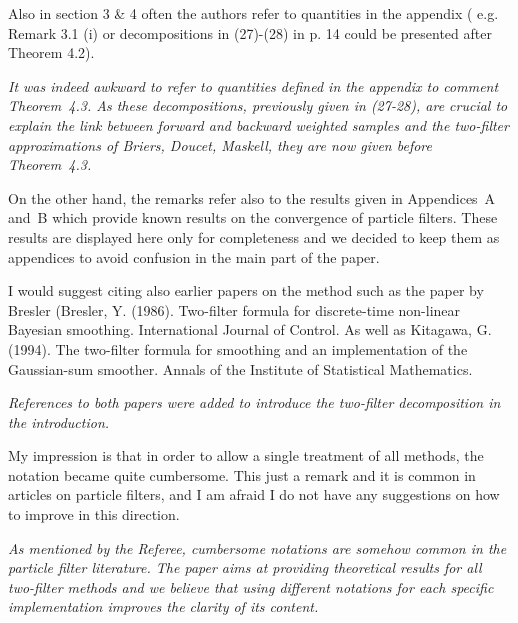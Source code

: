 \documentclass{article}
\begin{document}
\vspace{1cm}

Also in section 3 \& 4 often the authors refer to quantities in the appendix
( e.g. Remark 3.1 (i) or decompositions in (27)-(28) in p. 14 could be
presented after Theorem 4.2).

\vspace{.5cm}

{\em
It was indeed awkward to refer to quantities defined in the appendix to comment Theorem~4.3. As these decompositions, previously given in (27-28), are crucial to explain the link between forward and backward weighted samples and the two-filter approximations of Briers, Doucet, Maskell, they are now given before Theorem~4.3. 

On the other hand, the remarks refer also to the results given in Appendices~A and~B which provide known results on the convergence of particle filters. These results are displayed here only for completeness and we decided to keep them as appendices to avoid confusion in the main part of the paper.
}

\vspace{1cm}

I would suggest citing also earlier papers on the method such as the paper
by Bresler (Bresler, Y. (1986). Two-filter formula for discrete-time
non-linear Bayesian smoothing. International Journal of Control. As well as Kitagawa, G. (1994). The two-filter formula for
smoothing and an implementation of the Gaussian-sum smoother. Annals
of the Institute of Statistical Mathematics.

\vspace{.5cm}

{\em
References to both papers were added to introduce the two-filter decomposition in the introduction. 
}

\vspace{1cm}

My impression is that in order to allow a single treatment of all methods,
the notation became quite cumbersome. This just a remark and it is
common in articles on particle filters, and I am afraid I do not have any
suggestions on how to improve in this direction.

\vspace{.5cm}

{\em
As mentioned by the Referee, cumbersome notations are somehow common in the particle filter literature. The paper aims at providing theoretical results for all two-filter methods and we believe that using different notations for each specific implementation improves the clarity of its content.
}
\end{document}
